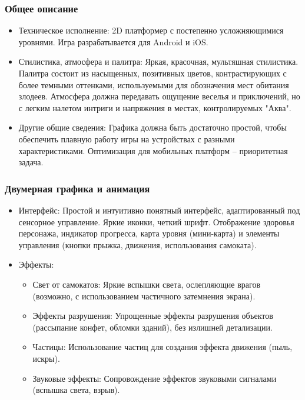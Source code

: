 \documentclass[article,12pt, fleqn]{article}
\begin{document}
\begin{itemize}
\subsubsection{Общее описание}
\begin{itemize}
    \item Техническое исполнение: 
            2D платформер с постепенно усложняющимися уровнями. Игра разрабатывается для Android и iOS.
    \item Стилистика, атмосфера и палитра: 
            Яркая, красочная, мультяшная стилистика. Палитра состоит из насыщенных, позитивных цветов, контрастирующих с более темными оттенками, используемыми для обозначения мест обитания злодеев. Атмосфера должна передавать ощущение веселья и приключений, но с легким налетом интриги и напряжения в местах, контролируемых "Аква".
    \item Другие общие сведения: 
            Графика должна быть достаточно простой, чтобы обеспечить плавную работу игры на устройствах с разными характеристиками. Оптимизация для мобильных платформ – приоритетная задача.
\end{itemize}
\subsubsection{Двумерная графика и анимация}
\begin{itemize}
    \item Интерфейс: Простой и интуитивно понятный интерфейс, адаптированный под сенсорное управление. Яркие иконки, четкий шрифт. Отображение здоровья персонажа, индикатор прогресса, карта уровня (мини-карта) и элементы управления (кнопки прыжка, движения, использования самоката).
    \item Эффекты:
    \begin{itemize}
        \item Свет от самокатов: Яркие вспышки света, ослепляющие врагов (возможно, с использованием частичного затемнения экрана).
        \item Эффекты разрушения: Упрощенные эффекты разрушения объектов (рассыпание конфет, обломки зданий), без излишней детализации.
        \item Частицы: Использование частиц для создания эффекта движения (пыль, искры).
        \item Звуковые эффекты: Сопровождение эффектов звуковыми сигналами (вспышка света, взрыв).
    \end{itemize}


\end{itemize}
\end{itemize}
\end{document}
